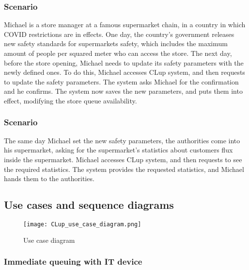 \documentclass[../../main.tex]{subfiles}
\begin{document}
      \subsubsection{Scenario }

        Michael is a store manager at a famous supermarket chain, in a country in which COVID 
        restrictions are in effects.
        One day, the country's government releases new safety standards for supermarkets safety, which 
        includes the maximum amount of people per squared meter who can access the store. 
        The next day, before the store opening, Michael needs to update its safety parameters with the 
        newly defined ones. 
        To do this, Michael accesses CLup system, and then requests to update the safety parameters. 
        The system asks Michael for the confirmation and he confirms. 
        The system now saves the new parameters, and puts them into effect, modifying the store queue 
        availability.



      \subsubsection{Scenario }

        The same day Michael set the new safety parameters, the authorities come into his supermarket, 
        asking for the supermarket's statistics about customers flux inside the supermarket. 
        Michael accesses CLup system, and then requests to see the required statistics. 
        The system provides the requested statistics, and Michael hands them to the authorities. 



    \subsection{Use cases and sequence diagrams}

      \begin{figure}[H]
        \centering
        \texttt{[image: CLup\_use\_case\_diagram.png]}
        \caption{Use case diagram}
      \end{figure}

      \subsubsection{Immediate queuing with IT device}
\end{document}
